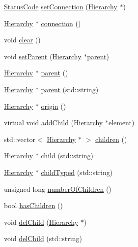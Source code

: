 \begin{DoxyCompactItemize}
\item 
\hyperlink{classStatusCode}{Status\+Code} \hyperlink{classElement_ab476b4b1df5954141ceb14f072433b89}{set\+Connection} (\hyperlink{classHierarchy}{Hierarchy} $\ast$)
\item 
\hyperlink{classHierarchy}{Hierarchy} $\ast$ \hyperlink{classElement_af57444353c1ddf9fa0109801e97debf7}{connection} ()
\item 
void \hyperlink{classHierarchy_af4d43b0765b402670eed2d62c73405af}{clear} ()
\item 
void \hyperlink{classHierarchy_a585ad1aeec16077a0e532ab8b4fc557b}{set\+Parent} (\hyperlink{classHierarchy}{Hierarchy} $\ast$\hyperlink{classHierarchy_a1c7bec8257e717f9c1465e06ebf845fc}{parent})
\item 
\hyperlink{classHierarchy}{Hierarchy} $\ast$ \hyperlink{classHierarchy_a1c7bec8257e717f9c1465e06ebf845fc}{parent} ()
\item 
\hyperlink{classHierarchy}{Hierarchy} $\ast$ \hyperlink{classHierarchy_ad550588733bf75ac5c0fcfd7c8fd11a6}{parent} (std\+::string)
\item 
\hyperlink{classHierarchy}{Hierarchy} $\ast$ \hyperlink{classHierarchy_aee461dc930ce3871636ff87f075b1b83}{origin} ()
\item 
virtual void \hyperlink{classHierarchy_ad677774ff38fcb257c04a3a10d471fac}{add\+Child} (\hyperlink{classHierarchy}{Hierarchy} $\ast$element)
\item 
std\+::vector$<$ \hyperlink{classHierarchy}{Hierarchy} $\ast$ $>$ \hyperlink{classHierarchy_aa9a76f69e98e052ee1a6e32cea006288}{children} ()
\item 
\hyperlink{classHierarchy}{Hierarchy} $\ast$ \hyperlink{classHierarchy_a1e207f973c694b538bf90107b4868817}{child} (std\+::string)
\item 
\hyperlink{classHierarchy}{Hierarchy} $\ast$ \hyperlink{classHierarchy_a0c15a5276a3b80b4354d6bd8a01e0708}{child\+Typed} (std\+::string)
\item 
unsigned long \hyperlink{classHierarchy_ab16e84de65fd84e14001a6cf941c8be4}{number\+Of\+Children} ()
\item 
bool \hyperlink{classHierarchy_a255174fe4d316d2a3f430dcb9dab29f1}{has\+Children} ()
\item 
void \hyperlink{classHierarchy_a2b2b359fac003233f65786a616766bde}{del\+Child} (\hyperlink{classHierarchy}{Hierarchy} $\ast$)
\item 
void \hyperlink{classHierarchy_a1928ac7615fe0b5e55cd707f70dc6781}{del\+Child} (std\+::string)
\item 

\end{DoxyCompactItemize}
